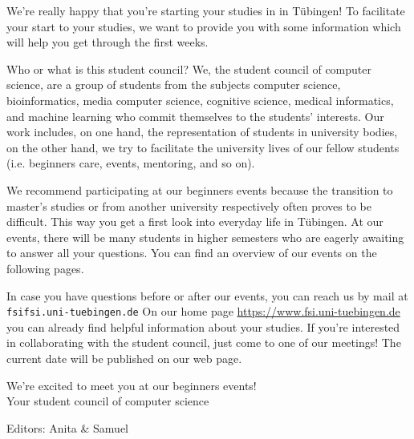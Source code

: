 \thispagestyle{firststyle}
We're really happy that you're starting your studies in \studiengang in Tübingen!
To facilitate your start to your studies, we want to provide you with some information which will help you get through the first weeks.

Who or what is this \glqq student council\grqq? We, the student council of computer science, are a group of students from the subjects computer science, bioinformatics, media computer science, cognitive science, medical informatics, and machine learning
who commit themselves to the students' interests. Our work includes, on one hand, the representation of students in university bodies, on the other hand, we try to facilitate the university lives of our fellow students (i.e. beginners care,
events, mentoring, and so on).

\ifmaster
    \ifml
We recommend participating at our beginners events because the transition to master's studies or from another university respectively often proves to be difficult. This way you get a first look into everyday life in Tübingen.
    \fi
\fi
At our events, there will be many students in higher semesters who are eagerly awaiting to answer all your questions. You can find an overview of our events on the following pages.

In case you have questions before or after our events, you can reach us by mail at \texttt{fsi\At fsi.uni-tuebingen.de}
On our home page
\url{https://www.fsi.uni-tuebingen.de} you can already find helpful information about your studies. If you're interested in collaborating with the student council, just come to one of our meetings! The current date will be published on our web page.

We're excited to meet you at our beginners events!\\
Your student council of computer science
\par\hfill{\footnotesize Editors: Anita \& Samuel}
\vfill

